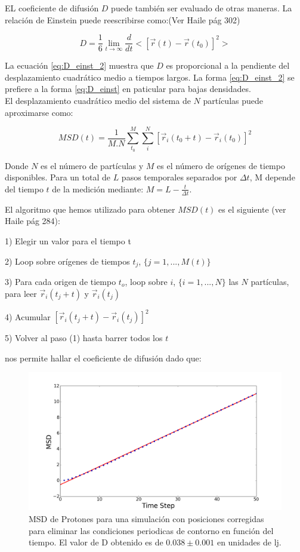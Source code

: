 \documentclass[
 reprint,
 amsmath,amssymb,
 aps,
 a4paper
]{revtex4-1}
\begin{document}
EL coeficiente de difusión $D$ puede también ser evaluado de otras maneras. La relación de Einstein puede reescribirse como:(Ver Haile pág 302)

\begin{equation}\label{eq:D_einst_2}
D=\frac{1}{6}\lim_{t \to \infty}\frac{d}{dt}<[\vec{r}(t)-\vec{r}(t_0)]^2>
\end{equation}

La ecuación \ref{eq:D_einst_2} muestra que $D$ es proporcional a la pendiente del desplazamiento cuadrático medio a tiempos largos. La forma \ref{eq:D_einst_2} se prefiere a la forma \ref{eq:D_einst} en paticular para bajas densidades.\\

El desplazamiento cuadrático medio del sistema de $N$ partículas puede aproximarse como:

\begin{equation}\label{eq:MSD}
MSD(t)=\frac{1}{M.N}\sum_{t_0}^{M}\sum_{i}^{N}[\vec{r}_i(t_0+t)-\vec{r}_i(t_0)]^2
\end{equation}

Donde $N$ es el número de partículas y $M$ es el número de orígenes de tiempo disponibles. Para un total de $L$ pasos temporales separados por $\Delta t$, M depende del tiempo $t$ de la medición mediante: $M=L-\frac{t}{\Delta t}$. 

El algoritmo que hemos utilizado para obtener $MSD(t)$ es el siguiente (ver Haile pág 284):

1) Elegir un valor para el tiempo t

2) Loop sobre orígenes de tiempos $t_j$, $\{j=1,...,M(t)\}$

3) Para cada origen de tiempo $t_o$, loop sobre $i$, $\{i=1,...,N\}$ las $N$ partículas, para leer $\vec{r}_i(t_j+t)$ y $\vec{r}_i(t_j)$

4) Acumular $[\vec{r}_i(t_{j}+t)-\vec{r}_i(t_{j})]^2$

5) Volver al paso (1) hasta barrer todos los $t$

 nos permite hallar el coeficiente de difusión dado que:

 

\begin{figure}[H]
\centerline{
  \includegraphics[width=1.0\linewidth]{msdvst_prot.png}}
  \caption{\small MSD de Protones para una simulación con posiciones corregidas para eliminar las condiciones periodicas de contorno en función del tiempo. El valor de D obtenido es de $0.038 \pm 0.001$ en unidades de lj.}
  \label{fig:msdprot}
\end{figure}
\end{document}
